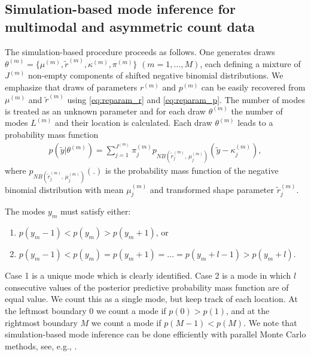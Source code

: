 \documentclass[11pt]{article}
\begin{document}
%


\subsection{Simulation-based mode inference for multimodal and asymmetric count data}
\label{appsec:modeestimation}


The simulation-based procedure proceeds as follows. 
One generates draws $\theta^{(m)} = \{ \mu^{(m)}, \tilde r^{(m)}, \kappa^{(m)}, \pi^{(m)} \}$ 
$(m=1,\ldots,M)$, each defining a mixture of $J^{(m)}$ non-empty components of shifted negative binomial distributions. We emphasize that draws of parameters $r^{(m)}$ and $p^{(m)}$ can be easily recovered from $\mu^{(m)}$ and $\tilde{r}^{(m)}$ using \eqref{eq:reparam_r} and \eqref{eq:reparam_p}. The number of modes is treated as an unknown parameter and for each draw $\theta^{(m)}$ the number of modes $L^{(m)}$ and their location is calculated. Each draw $\theta^{(m)}$ leads to a probability mass function
\begin{align}
 p(\tilde y | \theta^{(m)})
      =\sum_{j=1}^{J^{(m)}} \pi_j^{(m)}
p_{NB(\tilde r_j^{(m)}, \, \mu_j^{(m)})}\left(\tilde y -\kappa_j^{(m)}\right),
\end{align}
where $p_{NB(\tilde r_j^{(m)}, \, \mu_j^{(m)})}(.)$ is the 
probability mass function of the negative binomial distribution with mean $\mu_j^{(m)}$ and transformed shape parameter $\tilde r_j^{(m)}$.


The modes $y_m$ must satisfy either:
\begin{enumerate}
	\item $p(y_{m}-1) < p(y_{m}) > p(y_{m}+1)$, or
	\item $p(y_{m}-1) < p(y_{m}) = p(y_{m}+1) = \ldots =p(y_{m}+l-1) > p(y_{m}+l)$.
\end{enumerate}
Case 1 is a unique mode which is clearly identified. Case 2 is a mode in which $l$ consecutive values of the posterior predictive probability mass function are of equal value. We count this as a single mode, but keep track of each location.
At the leftmost boundary 0 we count a mode if $p(0) > p(1)$, and at the rightmost boundary $M$ we count a mode if $p(M-1) < p(M)$.
We note that simulation-based mode inference can be done efficiently with parallel Monte Carlo methods, see, e.g., \cite{BGHVD2016}.
\end{document}
